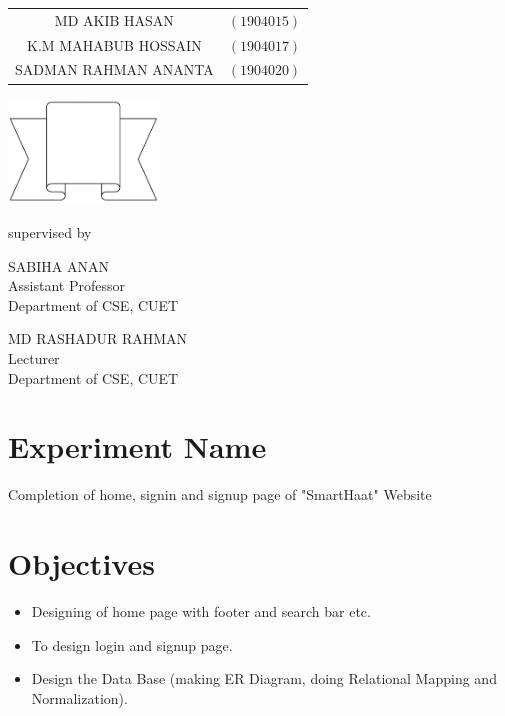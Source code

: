 \documentclass[a4paper,12pt]{report}
\begin{document}
\begin{titlepage}
{		\begin{tabular}{cl}
			MD AKIB HASAN        & $(1904015)$ \\
			K.M MAHABUB HOSSAIN  & $(1904017)$ \\
			SADMAN RAHMAN ANANTA & $(1904020)$ \\
		\end{tabular}
	}
	\parbox[r]{7cm}{
		\vspace{1cm}
		\begin{center}
			\includegraphics[width=4cm, keepaspectratio]{remarks.png}
		\end{center}
	}

	\vspace{0.5cm}
	supervised by

	\parbox[l]{8cm}{\begin{center}

			SABIHA ANAN\\
\footnotesize{Assistant Professor\\
				Department of CSE, CUET}
		\end{center}
	}
	\parbox[r]{8cm}{\begin{center}

			MD RASHADUR RAHMAN\\
\footnotesize{Lecturer \\
				Department of CSE, CUET}
		\end{center}
	}

	\vfill
\end{titlepage}


\onehalfspacing

\section*{Experiment Name}
Completion of home, signin and signup page  of "SmartHaat" Website
\section*{Objectives}
\begin{itemize}
	\item Designing of home page with footer and search bar etc.
	\item To design login and signup page.
	\item Design the Data Base (making ER Diagram, doing Relational Mapping and Normalization).
\end{itemize}
\end{document}
